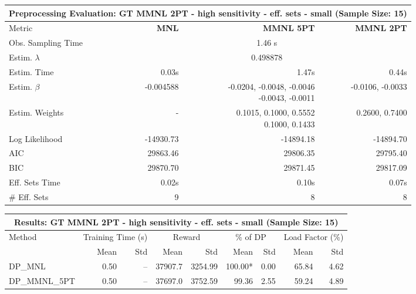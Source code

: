 
\begin{samepage}
\begin{center}
  \small
  \begin{tabular}{l|r|r|r}
    \toprule
    \multicolumn{4}{c}{\textbf{Preprocessing Evaluation: GT MMNL 2PT - high sensitivity - eff. sets - small (Sample Size: 15)}} \\
    \midrule
    Metric & \textbf{MNL} & \textbf{MMNL 5PT} & \textbf{MMNL 2PT} \\
    \midrule
    Obs. Sampling Time & \multicolumn{3}{c}{1.46 s} \\
    Estim. $\lambda$ & \multicolumn{3}{c}{0.498878} \\
    Estim. Time & 0.03s & 1.47s & 0.44s \\
    Estim. $\beta$ & -0.004588 & \makecell[tr]{-0.0204, -0.0048, -0.0046 \\ -0.0043, -0.0011} & -0.0106, -0.0033 \\
    Estim. Weights & - & \makecell[tr]{0.1015, 0.1000, 0.5552 \\ 0.1000, 0.1433} & 0.2600, 0.7400 \\
    Log Likelihood & -14930.73 & -14894.18 & -14894.70 \\
    AIC & 29863.46 & 29806.35 & 29795.40 \\
    BIC & 29870.70 & 29871.45 & 29817.09 \\
    Eff. Sets Time & 0.02s & 0.10s & 0.07s \\
    \# Eff. Sets & 9 & 8 & 8 \\
    \bottomrule
  \end{tabular}
\end{center}
\begin{center}
  \small
  \begin{tabular}{l|rr|rr|rr|rr}
    \toprule
    \multicolumn{9}{c}{\textbf{Results: GT MMNL 2PT - high sensitivity - eff. sets - small (Sample Size: 15)}} \\
    \midrule
    Method & \multicolumn{2}{c|}{Training Time (s)} & \multicolumn{2}{c|}{Reward} & \multicolumn{2}{c|}{\% of DP} & \multicolumn{2}{c}{Load Factor (\%)} \\
    & Mean & Std & Mean & Std & Mean & Std & Mean & Std \\
    \midrule
    DP\_MNL      &     0.50 &    -- &    37907.7 &    3254.99 & 100.00* &    0.00 &   65.84 &    4.62 \\
    DP\_MMNL\_5PT &     0.50 &    -- &    37697.0 &    3752.59 &   99.36 &    2.55 &   59.24 &    4.89 \\

\end{tabular}
\end{center}
\end{samepage}
